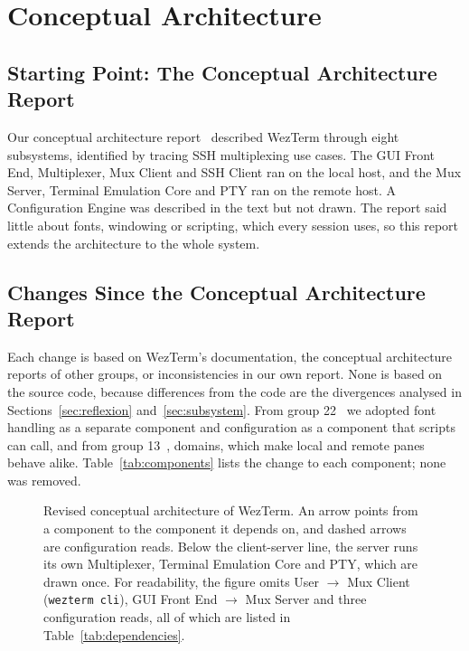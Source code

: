 \section{Conceptual Architecture}
\label{sec:conceptual}


\subsection{Starting Point: The Conceptual Architecture Report}
\label{sec:a1-summary}

Our conceptual architecture report~\cite{a1-report} described WezTerm through eight subsystems, identified by tracing SSH multiplexing use cases. The GUI Front End, Multiplexer, Mux Client and SSH Client ran on the local host, and the Mux Server, Terminal Emulation Core and PTY ran on the remote host. A Configuration Engine was described in the text but not drawn. The report said little about fonts, windowing or scripting, which every session uses, so this report extends the architecture to the whole system.

\subsection{Changes Since the Conceptual Architecture Report}
\label{sec:a1-changes}

Each change is based on WezTerm's documentation, the conceptual architecture reports of other groups, or inconsistencies in our own report. None is based on the source code, because differences from the code are the divergences analysed in Sections~\ref{sec:reflexion} and~\ref{sec:subsystem}. From group 22~\cite{g22-a1} we adopted font handling as a separate component and configuration as a component that scripts can call, and from group 13~\cite{g13-a1}, domains, which make local and remote panes behave alike. Table~\ref{tab:components} lists the change to each component; none was removed.

\begin{figure}[!bt]
  \centering
  \begin{minipage}{0.85\linewidth}\end{minipage}
  \caption{Revised conceptual architecture of WezTerm. An arrow points from a component to the component it depends on, and dashed arrows are configuration reads. Below the client-server line, the server runs its own Multiplexer, Terminal Emulation Core and PTY, which are drawn once. For readability, the figure omits User $\rightarrow$ Mux Client (\texttt{wezterm cli}), GUI Front End $\rightarrow$ Mux Server and three configuration reads, all of which are listed in Table~\ref{tab:dependencies}.}
  \label{fig:conceptual}
\end{figure}


